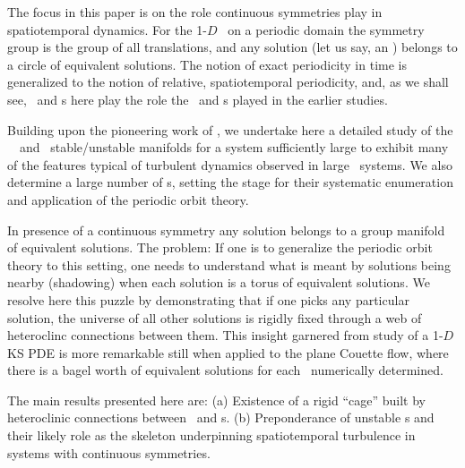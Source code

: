 The focus in this paper is on the role continuous symmetries
play in spatiotemporal dynamics. For the 1-$D$ \KS\ on a periodic domain
the symmetry group is the group of all translations, and
any solution (let us say, an \eqv) belongs to a circle of equivalent
solutions. The notion of exact periodicity in time is 
generalized to the notion of relative, spatiotemporal periodicity, and,
as we shall see, 
\reqva\ and \rpo s here play the role the \eqva\ and
\po s played in the earlier studies. 

Building upon the pioneering work of
, we undertake here a detailed study of the 
\KS\ \eqva\ and \reqva\ stable/unstable manifolds
for a system sufficiently large to exhibit many of
the features typical of turbulent dynamics observed in large \KS\ systems.
We also determine a large number of \rpo s, setting the
stage for their systematic enumeration and application 
of the periodic orbit theory.

In presence of a continuous symmetry any solution belongs to a 
group manifold of equivalent solutions. The problem: If one is to generalize
the periodic orbit theory to this setting, one needs to understand what
is meant by solutions being nearby (shadowing) when each solution is
a torus of equivalent solutions. 
We resolve here this puzzle by demonstrating that if one picks
any particular solution, the universe of all other solutions is
rigidly fixed through a web of heteroclinc connections between them.
This insight garnered from study of a
1-$D$ KS PDE is more remarkable still when applied to
the plane Couette flow, where there
is a bagel worth of equivalent solutions for each \eqv\ numerically determined.


The main results presented here are:
(a) Existence of a rigid ``cage'' built by heteroclinic connections
between \eqva\ and \rpo s.
(b) Preponderance of unstable \rpo s and their likely
role as the skeleton underpinning spatiotemporal turbulence in
systems with continuous symmetries. 



